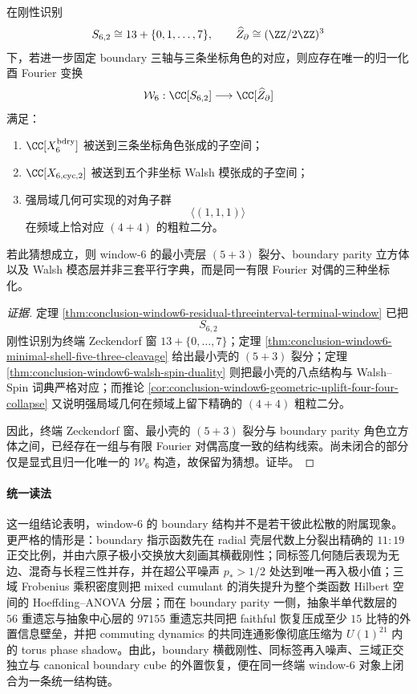 \begin{conjecture}\label{conj:conclusion-window6-normalized-walsh-zeckendorf-duality}
在刚性识别
\[
S_{6,2}\cong 13+\{0,1,\dots,7\},
\qquad
\widehat Z_{\partial}\cong (\ZZ/2\ZZ)^3
\]
下，若进一步固定 boundary 三轴与三条坐标角色的对应，则应存在唯一的归一化酉 Fourier 变换
\[
\mathcal W_6:\CC[S_{6,2}]\longrightarrow \CC[\widehat Z_{\partial}]
\]
满足：
\begin{enumerate}
\normalfont
  \item \(\CC[X_6^{\mathrm{bdry}}]\) 被送到三条坐标角色张成的子空间；
  \item \(\CC[X_{6,\mathrm{cyc},2}]\) 被送到五个非坐标 Walsh 模张成的子空间；
  \item 强局域几何可实现的对角子群
  \[
  \langle(1,1,1)\rangle
  \]
  在频域上恰对应 \((4+4)\) 的粗粒二分。
\end{enumerate}
若此猜想成立，则 window-\(6\) 的最小壳层 \((5+3)\) 裂分、boundary parity 立方体以及 Walsh 模态层并非三套平行字典，而是同一有限 Fourier 对偶的三种坐标化。
\end{conjecture}
\begin{proof}[证据]
定理 \ref{thm:conclusion-window6-residual-threeinterval-terminal-window} 已把
\[
S_{6,2}
\]
刚性识别为终端 Zeckendorf 窗 \(13+\{0,\dots,7\}\)；定理 \ref{thm:conclusion-window6-minimal-shell-five-three-cleavage} 给出最小壳的 \((5+3)\) 裂分；定理 \ref{thm:conclusion-window6-walsh-spin-duality} 则把最小壳的八点结构与 Walsh--Spin 词典严格对应；而推论 \ref{cor:conclusion-window6-geometric-uplift-four-four-collapse} 又说明强局域几何在频域上留下精确的 \((4+4)\) 粗粒二分。

因此，终端 Zeckendorf 窗、最小壳的 \((5+3)\) 裂分与 boundary parity 角色立方体之间，已经存在一组与有限 Fourier 对偶高度一致的结构线索。尚未闭合的部分仅是显式且归一化唯一的 \(\mathcal W_6\) 构造，故保留为猜想。证毕。
\end{proof}

\paragraph{统一读法}
这一组结论表明，window-\(6\) 的 boundary 结构并不是若干彼此松散的附属现象。更严格的情形是：boundary 指示函数先在 radial 壳层代数上分裂出精确的 \(11{:}19\) 正交比例，并由六原子极小交换放大刻画其横截刚性；同标签几何随后表现为无边、混奇与长程三性并存，并在超公平噪声 \(p_*>1/2\) 处达到唯一再入极小值；三域 Frobenius 乘积密度则把 mixed cumulant 的消失提升为整个类函数 Hilbert 空间的 Hoeffding--ANOVA 分层；而在 boundary parity 一侧，抽象半单代数层的 \(56\) 重遗忘与抽象中心层的 \(97155\) 重遗忘共同把 faithful 恢复压成至少 \(15\) 比特的外置信息壁垒，并把 commuting dynamics 的共同连通影像彻底压缩为 \(U(1)^{21}\) 内的 torus phase shadow。由此，boundary 横截刚性、同标签再入噪声、三域正交独立与 canonical boundary cube 的外置恢复，便在同一终端 window-\(6\) 对象上闭合为一条统一结构链。

\endinput
